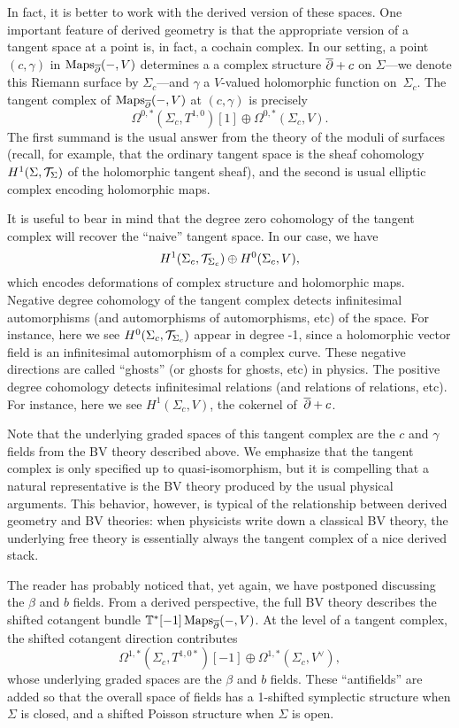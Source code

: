In fact, it is better to work with the derived version of these spaces.
One important feature of derived geometry is that the appropriate version of a tangent space at a point is, in fact, a cochain complex.
In our setting, a point $(c,\gamma)$ in $\operatorname{Maps}_{\overline{\partial}}(-,V)$ determines a a complex structure $\overline{\partial} + c$ on $\Sigma$---we denote this Riemann surface by $\Sigma_c$---and $\gamma$ a $V$-valued holomorphic function on~$\Sigma_c$.
The tangent complex of $\operatorname{Maps}_{\overline{\partial}}(-,V)$ at $(c,\gamma)$ is precisely 
\[
\Omega^{0,*}(\Sigma_c,T^{1,0})[1] \oplus \Omega^{0,*}(\Sigma_c,V).
\]
The first summand is the usual answer from the theory of the moduli of surfaces 
(recall, for example, that the ordinary tangent space is the sheaf cohomology $H^1(\Sigma,\mathcal T_\Sigma)$ of the holomorphic tangent sheaf),
and the second is usual elliptic complex encoding holomorphic maps.

\begin{rmk}
It is useful to bear in mind that the degree zero cohomology of the tangent complex will recover the ``naive'' tangent space. 
In our case, we have 
\[
H^1(\Sigma_c,\mathcal T_{\Sigma_c}) \oplus H^0(\Sigma_c,V),
\]
which encodes deformations of complex structure and holomorphic maps.
Negative degree cohomology of the tangent complex detects infinitesimal automorphisms (and automorphisms of automorphisms, etc) of the space.
For instance, here we see $H^0(\Sigma_c,\mathcal T_{\Sigma_c})$ appear in degree -1, 
since a holomorphic vector field is an infinitesimal automorphism of a complex curve.
These negative directions are called ``ghosts'' (or ghosts for ghosts, etc) in physics.
The positive degree cohomology detects infinitesimal relations (and relations of relations, etc).
For instance, here we see $H^1(\Sigma_c,V)$, the cokernel of~$\overline{\partial}+c$. 
\end{rmk}

Note that the underlying graded spaces of this tangent complex are the $c$ and $\gamma$ fields from the BV theory described above.
We emphasize that the tangent complex is only specified up to quasi-isomorphism,
but it is compelling that a natural representative is the BV theory produced by the usual physical arguments.
This behavior, however, is typical of the relationship between derived geometry and BV theories:
when physicists write down a classical BV theory, 
the underlying free theory is essentially always the tangent complex of a nice derived stack.

The reader has probably noticed that, yet again, we have postponed discussing the $\beta$ and $b$ fields.
From a derived perspective, the full BV theory describes the shifted cotangent bundle $\mathbb T^*[-1]\operatorname{Maps}_{\overline{\partial}}(-,V)$.
At the level of a tangent complex, the shifted cotangent direction contributes
\[
\Omega^{1,*}(\Sigma_c,T^{1,0*})[-1] \oplus \Omega^{1,*}(\Sigma_c,V^\vee),
\]
whose underlying graded spaces are the $\beta$ and $b$ fields.
These ``antifields'' are added so that the overall space of fields has a 1-shifted symplectic structure  when $\Sigma$ is closed, and a shifted Poisson structure when $\Sigma$ is open.

